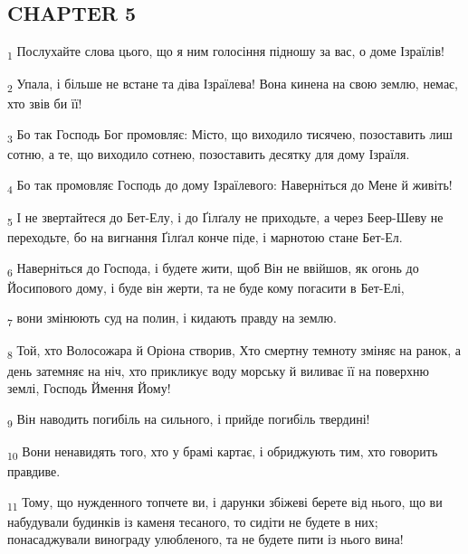 \subsection{CHAPTER 5}
\begin{tcolorbox}
\textsubscript{1} Послухайте слова цього, що я ним голосіння підношу за вас, о доме Ізраїлів!
\end{tcolorbox}
\begin{tcolorbox}
\textsubscript{2} Упала, і більше не встане та діва Ізраїлева! Вона кинена на свою землю, немає, хто звів би її!
\end{tcolorbox}
\begin{tcolorbox}
\textsubscript{3} Бо так Господь Бог промовляє: Місто, що виходило тисячею, позоставить лиш сотню, а те, що виходило сотнею, позоставить десятку для дому Ізраїля.
\end{tcolorbox}
\begin{tcolorbox}
\textsubscript{4} Бо так промовляє Господь до дому Ізраїлевого: Наверніться до Мене й живіть!
\end{tcolorbox}
\begin{tcolorbox}
\textsubscript{5} І не звертайтеся до Бет-Елу, і до Ґілґалу не приходьте, а через Беер-Шеву не переходьте, бо на вигнання Ґілґал конче піде, і марнотою стане Бет-Ел.
\end{tcolorbox}
\begin{tcolorbox}
\textsubscript{6} Наверніться до Господа, і будете жити, щоб Він не ввійшов, як огонь до Йосипового дому, і буде він жерти, та не буде кому погасити в Бет-Елі,
\end{tcolorbox}
\begin{tcolorbox}
\textsubscript{7} вони змінюють суд на полин, і кидають правду на землю.
\end{tcolorbox}
\begin{tcolorbox}
\textsubscript{8} Той, хто Волосожара й Оріона створив, Хто смертну темноту зміняє на ранок, а день затемняє на ніч, хто прикликує воду морську й виливає її на поверхню землі, Господь Ймення Йому!
\end{tcolorbox}
\begin{tcolorbox}
\textsubscript{9} Він наводить погибіль на сильного, і прийде погибіль твердині!
\end{tcolorbox}
\begin{tcolorbox}
\textsubscript{10} Вони ненавидять того, хто у брамі картає, і обриджують тим, хто говорить правдиве.
\end{tcolorbox}
\begin{tcolorbox}
\textsubscript{11} Тому, що нужденного топчете ви, і дарунки збіжеві берете від нього, що ви набудували будинків із каменя тесаного, то сидіти не будете в них; понасаджували винограду улюбленого, та не будете пити із нього вина!
\end{tcolorbox}

